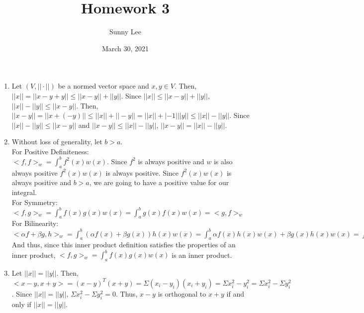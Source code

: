 \documentclass{article}
\title{Homework 3}
\author{Sunny Lee}
\date{March 30, 2021}
\begin{document}
\begin{enumerate}
    \item Let $(V, ||\cdot||)$ be a normed vector space and $x, y\in V$. Then, 
    $||x|| = ||x - y + y|| \leq ||x-y||+||y||$. Since $||x|| \leq ||x-y||+||y||$, 
    $||x|| - ||y|| \leq ||x-y||$. Then, $||x-y|| = ||x + (-y)|| \leq ||x|| + ||-y||
    = ||x|| + |-1|||y|| \leq ||x|| - ||y||$. Since $||x|| - ||y|| \leq ||x-y||$ and
    $||x-y|| \leq ||x|| - ||y||$, $||x-y|| = ||x|| - ||y||$. 

    \item Without loss of generality, let $b > a$. \\
    For Positive Definiteness: \\
    $<f, f>_w = \int_a^bf^2(x)w(x)$. Since $f^2$ is always positive and $w$ is 
    also always positive $f^2(x)w(x)$ is always positive. Since $f^2(x)w(x)$ is 
    always positive and $b > a$, we are going to have a positive value for our 
    integral. \\
    For Symmetry: \\
    $<f, g>_w = \int_a^bf(x)g(x)w(x) = \int_a^bg(x)f(x)w(x) = <g, f>_w$\\
    For Bilinearity: \\
    $<\alpha f+\beta g, h>_w = \int_a^b(\alpha f(x) + \beta g(x))h(x)w(x) = 
    \int_a^b\alpha f(x)h(x)w(x) + \beta g(x)h(x)w(x) = \int_a^b\alpha f(x)h(x)w(x) + \int_a^b\beta g(x)h(x)w(x) =
    <f, h>_w + <g, h>_w$\\
    And thus, since this inner product definition satisfies the properties of an inner
    product, $<f, g>_w = \int_a^bf(x)g(x)w(x)$ is an inner product. 

    \item Let $||x|| = ||y||$. Then, $<x-y, x+y> = (x-y)^T(x+y) = \Sigma (x_i-y_i)(x_i+y_i)
    = \Sigma x_i^2 - y_i^2 = \Sigma x_i^2 - \Sigma y_i^2$. Since $||x|| = ||y||$, 
    $\Sigma x_i^2 - \Sigma y_i^2 = 0$. Thus, $x-y$ is orthogonal to $x+y$ if and only 
    if $||x|| = ||y||$. 


\end{enumerate}
\end{document}

